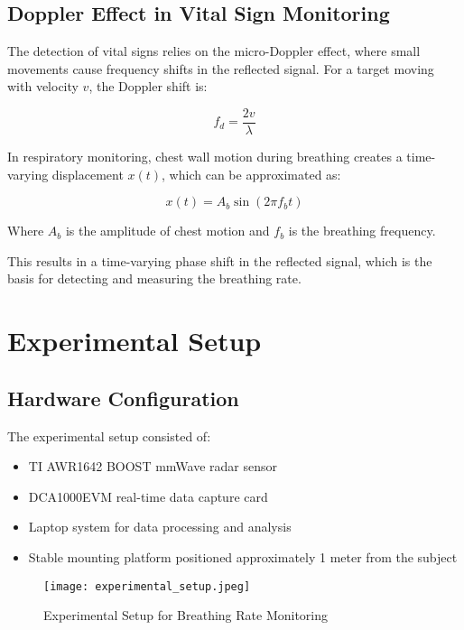 \documentclass[12pt]{article}
\begin{document}
\subsection{Doppler Effect in Vital Sign Monitoring}
The detection of vital signs relies on the micro-Doppler effect, where small movements cause frequency shifts in the reflected signal. For a target moving with velocity $v$, the Doppler shift is:

\begin{equation}
f_d = \frac{2v}{\lambda}
\end{equation}

In respiratory monitoring, chest wall motion during breathing creates a time-varying displacement $x(t)$, which can be approximated as:

\begin{equation}
x(t) = A_b \sin(2\pi f_b t)
\end{equation}

Where $A_b$ is the amplitude of chest motion and $f_b$ is the breathing frequency.

This results in a time-varying phase shift in the reflected signal, which is the basis for detecting and measuring the breathing rate.

\section{Experimental Setup}

\subsection{Hardware Configuration}
The experimental setup consisted of:

\begin{itemize}
    \item TI AWR1642 BOOST mmWave radar sensor
    \item DCA1000EVM real-time data capture card
    \item Laptop system for data processing and analysis
    \item Stable mounting platform positioned approximately 1 meter from the subject
\end{itemize}

\begin{figure}[H]
\centering
\texttt{[image: experimental\_setup.jpeg]} %
\caption{Experimental Setup for Breathing Rate Monitoring}
\end{figure}
\end{document}
